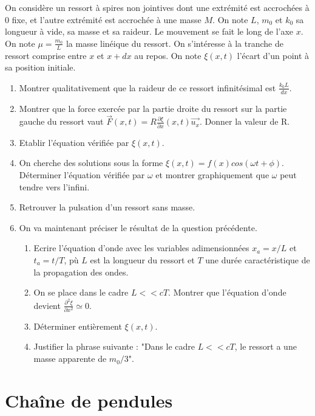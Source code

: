 \documentclass{article}
\begin{document}
On considère un ressort à spires non jointives dont une extrémité est accrochées à $0$ fixe, et l'autre extrémité est accrochée à une masse $M$. 
On note $L$, $m_0$ et $k_0$ sa longueur à vide, sa masse et sa raideur. 
Le mouvement se fait le long de l'axe $x$.
On note $\mu = \frac{m_0}{L}$ la masse linéique du ressort.
On s'intéresse à la tranche de ressort comprise entre $x$ et $x+dx$ au repos.
On note $\xi(x,t)$ l'écart d'un point à sa position initiale. 
\begin{enumerate}
  \item Montrer qualitativement que la raideur de ce ressort infinitésimal est $\frac{k_0 L }{dx}$.
  \item Montrer que la force exercée par la partie droite du ressort sur la partie gauche du ressort vaut $\vec{F}(x,t)=R \frac{\partial \xi}{\partial x}(x,t) \vec{u_x}$. Donner la valeur de R. 
  \item Etablir l'équation vérifiée par $\xi(x,t)$.
  \item On cherche des solutions sous la forme $\xi(x,t) = f(x) cos(\omega t + \phi)$. Déterminer l'équation vérifiée par $\omega$ et montrer graphiquement que $\omega$ peut tendre vers l'infini.
  \item Retrouver la pulsation d'un ressort sans masse. 
  \item  On va maintenant préciser le résultat de la question précédente. 
    \begin{enumerate}
    \item Ecrire l'équation d'onde avec les variables adimensionnées $x_a = x/L$ et $t_a = t / T$, pù $L$ est la longueur du ressort et $T$ une durée caractéristique de la propagation des ondes. 
    \item On se place dans le cadre $L<<cT$. Montrer que l'équation d'onde devient $ \frac{\partial ^2 \xi}{\partial x ^2} \simeq 0 $. 
    \item Déterminer entièrement $\xi(x,t)$.
    \item Justifier la phrase suivante :  "Dans le cadre $L<<cT$, le ressort a une masse apparente de $m_0/3$".
    \end{enumerate}    
\end {enumerate}


\section{Chaîne de pendules}
\end{document}
